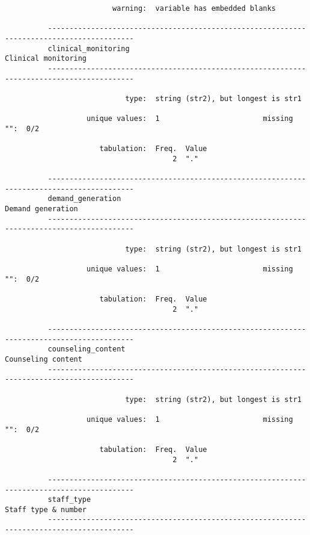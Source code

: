 \documentclass{article}
\begin{document}
\begin{verbatim}
                         warning:  variable has embedded blanks
          
          ------------------------------------------------------------------------------------------
          clinical_monitoring                                                    Clinical monitoring
          ------------------------------------------------------------------------------------------
          
                            type:  string (str2), but longest is str1
          
                   unique values:  1                        missing "":  0/2
          
                      tabulation:  Freq.  Value
                                       2  "."
          
          ------------------------------------------------------------------------------------------
          demand_generation                                                        Demand generation
          ------------------------------------------------------------------------------------------
          
                            type:  string (str2), but longest is str1
          
                   unique values:  1                        missing "":  0/2
          
                      tabulation:  Freq.  Value
                                       2  "."
          
          ------------------------------------------------------------------------------------------
          counseling_content                                                      Counseling content
          ------------------------------------------------------------------------------------------
          
                            type:  string (str2), but longest is str1
          
                   unique values:  1                        missing "":  0/2
          
                      tabulation:  Freq.  Value
                                       2  "."
          
          ------------------------------------------------------------------------------------------
          staff_type                                                             Staff type & number
          ------------------------------------------------------------------------------------------
          

\end{verbatim}
\end{document}
